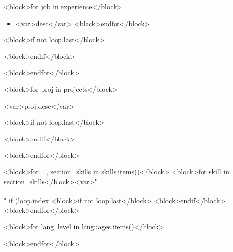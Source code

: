 \documentclass[10pt,a4paper,ragged2e,withhyper]{altacv}
\begin{document}
\begin{paracol}{2}

  <block>for job in experience</block>
  \begin{itemize}
    <block>for desc in job.descriptions</block>
    \item <var>desc</var>
    <block>endfor</block>
  \end{itemize}

  <block>if not loop.last</block>

  \divider

  <block>endif</block>

  <block>endfor</block>


  <block>for proj in projects</block>

  <var>proj.desc</var>

  <block>if not loop.last</block>

  \divider

  <block>endif</block>

  <block>endfor</block>

  \medskip

  \switchcolumn


  <block>for _, section_skills in skills.items()</block>
    <block>for skill in section_skills</block><var>"\\\\" if (loop.index %
  <block>if not loop.last</block>
  \divider\smallskip
  <block>endif</block>
  <block>endfor</block>


  <block>for lang, level in languages.items()</block>

  \divider

  <block>endfor</block>

  \medskip


\end{paracol}
\end{document}
